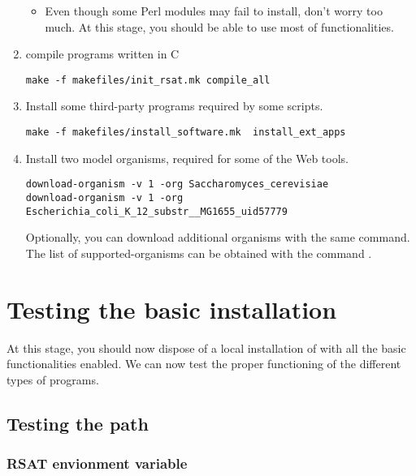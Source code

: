 \documentclass[12pt,a4paper, oneside]{scrreprt} %
\begin{document}
\begin{enumerate}
\begin{itemize}
  \item Even though some Perl modules may fail to install, don't worry
    too much. At this stage, you should be able to use most of \RSAT
    functionalities.
  \end{itemize}

\item compile \RSAT programs written in C

\begin{lstlisting}
make -f makefiles/init_rsat.mk compile_all
\end{lstlisting}

\item Install some third-party programs required by some \RSAT
  scripts.

\begin{lstlisting}
make -f makefiles/install_software.mk  install_ext_apps
\end{lstlisting}


\item Install two model organisms, required for some of the Web tools.

  \begin{lstlisting}
download-organism -v 1 -org Saccharomyces_cerevisiae
download-organism -v 1 -org Escherichia_coli_K_12_substr__MG1655_uid57779
  \end{lstlisting}
  
  Optionally, you can download additional organisms with the same
  command. The list of supported-organisms can be obtained with the
  command .

\end{enumerate}

\section{Testing the basic installation}

At this stage, you should now dispose of a local installation of \RSAT
with all the basic functionalities enabled. We can now test the proper
functioning of the different types of programs.

\subsection{Testing the path}

\subsubsection{RSAT envionment variable}
\end{document}
